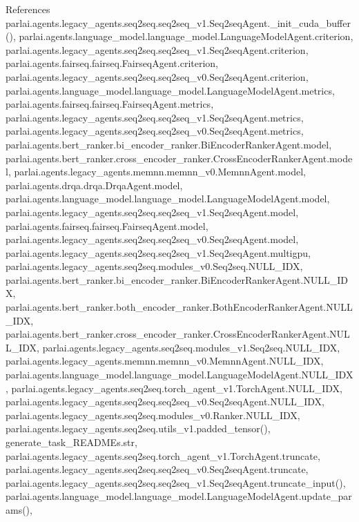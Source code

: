 References parlai.\+agents.\+legacy\+\_\+agents.\+seq2seq.\+seq2seq\+\_\+v1.\+Seq2seq\+Agent.\+\_\+init\+\_\+cuda\+\_\+buffer(), parlai.\+agents.\+language\+\_\+model.\+language\+\_\+model.\+Language\+Model\+Agent.\+criterion, parlai.\+agents.\+legacy\+\_\+agents.\+seq2seq.\+seq2seq\+\_\+v1.\+Seq2seq\+Agent.\+criterion, parlai.\+agents.\+fairseq.\+fairseq.\+Fairseq\+Agent.\+criterion, parlai.\+agents.\+legacy\+\_\+agents.\+seq2seq.\+seq2seq\+\_\+v0.\+Seq2seq\+Agent.\+criterion, parlai.\+agents.\+language\+\_\+model.\+language\+\_\+model.\+Language\+Model\+Agent.\+metrics, parlai.\+agents.\+fairseq.\+fairseq.\+Fairseq\+Agent.\+metrics, parlai.\+agents.\+legacy\+\_\+agents.\+seq2seq.\+seq2seq\+\_\+v1.\+Seq2seq\+Agent.\+metrics, parlai.\+agents.\+legacy\+\_\+agents.\+seq2seq.\+seq2seq\+\_\+v0.\+Seq2seq\+Agent.\+metrics, parlai.\+agents.\+bert\+\_\+ranker.\+bi\+\_\+encoder\+\_\+ranker.\+Bi\+Encoder\+Ranker\+Agent.\+model, parlai.\+agents.\+bert\+\_\+ranker.\+cross\+\_\+encoder\+\_\+ranker.\+Cross\+Encoder\+Ranker\+Agent.\+model, parlai.\+agents.\+legacy\+\_\+agents.\+memnn.\+memnn\+\_\+v0.\+Memnn\+Agent.\+model, parlai.\+agents.\+drqa.\+drqa.\+Drqa\+Agent.\+model, parlai.\+agents.\+language\+\_\+model.\+language\+\_\+model.\+Language\+Model\+Agent.\+model, parlai.\+agents.\+legacy\+\_\+agents.\+seq2seq.\+seq2seq\+\_\+v1.\+Seq2seq\+Agent.\+model, parlai.\+agents.\+fairseq.\+fairseq.\+Fairseq\+Agent.\+model, parlai.\+agents.\+legacy\+\_\+agents.\+seq2seq.\+seq2seq\+\_\+v0.\+Seq2seq\+Agent.\+model, parlai.\+agents.\+legacy\+\_\+agents.\+seq2seq.\+seq2seq\+\_\+v1.\+Seq2seq\+Agent.\+multigpu, parlai.\+agents.\+legacy\+\_\+agents.\+seq2seq.\+modules\+\_\+v0.\+Seq2seq.\+N\+U\+L\+L\+\_\+\+I\+DX, parlai.\+agents.\+bert\+\_\+ranker.\+bi\+\_\+encoder\+\_\+ranker.\+Bi\+Encoder\+Ranker\+Agent.\+N\+U\+L\+L\+\_\+\+I\+DX, parlai.\+agents.\+bert\+\_\+ranker.\+both\+\_\+encoder\+\_\+ranker.\+Both\+Encoder\+Ranker\+Agent.\+N\+U\+L\+L\+\_\+\+I\+DX, parlai.\+agents.\+bert\+\_\+ranker.\+cross\+\_\+encoder\+\_\+ranker.\+Cross\+Encoder\+Ranker\+Agent.\+N\+U\+L\+L\+\_\+\+I\+DX, parlai.\+agents.\+legacy\+\_\+agents.\+seq2seq.\+modules\+\_\+v1.\+Seq2seq.\+N\+U\+L\+L\+\_\+\+I\+DX, parlai.\+agents.\+legacy\+\_\+agents.\+memnn.\+memnn\+\_\+v0.\+Memnn\+Agent.\+N\+U\+L\+L\+\_\+\+I\+DX, parlai.\+agents.\+language\+\_\+model.\+language\+\_\+model.\+Language\+Model\+Agent.\+N\+U\+L\+L\+\_\+\+I\+DX, parlai.\+agents.\+legacy\+\_\+agents.\+seq2seq.\+torch\+\_\+agent\+\_\+v1.\+Torch\+Agent.\+N\+U\+L\+L\+\_\+\+I\+DX, parlai.\+agents.\+legacy\+\_\+agents.\+seq2seq.\+seq2seq\+\_\+v0.\+Seq2seq\+Agent.\+N\+U\+L\+L\+\_\+\+I\+DX, parlai.\+agents.\+legacy\+\_\+agents.\+seq2seq.\+modules\+\_\+v0.\+Ranker.\+N\+U\+L\+L\+\_\+\+I\+DX, parlai.\+agents.\+legacy\+\_\+agents.\+seq2seq.\+utils\+\_\+v1.\+padded\+\_\+tensor(), generate\+\_\+task\+\_\+\+R\+E\+A\+D\+M\+Es.\+str, parlai.\+agents.\+legacy\+\_\+agents.\+seq2seq.\+torch\+\_\+agent\+\_\+v1.\+Torch\+Agent.\+truncate, parlai.\+agents.\+legacy\+\_\+agents.\+seq2seq.\+seq2seq\+\_\+v0.\+Seq2seq\+Agent.\+truncate, parlai.\+agents.\+legacy\+\_\+agents.\+seq2seq.\+seq2seq\+\_\+v1.\+Seq2seq\+Agent.\+truncate\+\_\+input(), parlai.\+agents.\+language\+\_\+model.\+language\+\_\+model.\+Language\+Model\+Agent.\+update\+\_\+params(), 
